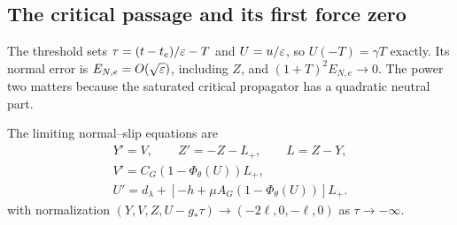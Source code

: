 \subsection{The critical passage and its first force zero}

The threshold sets $\tau=(t-t_e)/\varepsilon-T$ and $U=u/\varepsilon$, so
$U(-T)=\gamma T$ exactly. Its normal error is
$E_{N,e}=O(\sqrt{\varepsilon})$, including $Z$, and
$(1+T)^2E_{N,e}\to0$. The power two matters because the saturated
critical propagator has a quadratic neutral part.

The limiting normal--slip equations are
\begin{equation}
 \begin{gathered}
 Y'=V,\qquad Z'=-Z-L_+,\qquad L=Z-Y,\\
 V'=C_G(1-\Phi_\theta(U))L_+,\\
 U'=d_\lambda+[-h+\mu A_G(1-\Phi_\theta(U))]L_+.
 \end{gathered}
 \label{ent:critical-field}
\end{equation}
with normalization
$(Y,V,Z,U-g_*\tau)\to(-2\ell,0,-\ell,0)$ as $\tau\to-\infty$.

